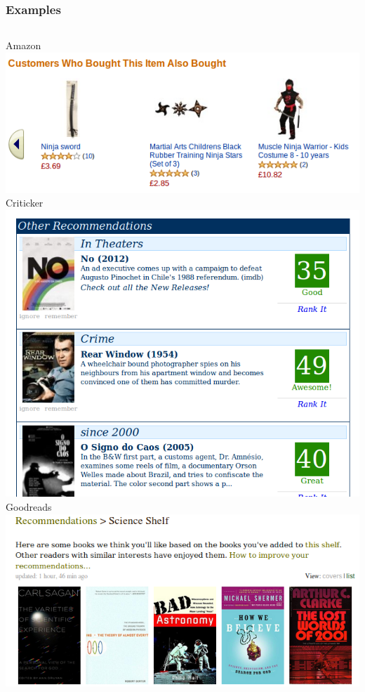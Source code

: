 \documentclass{beamer}
\begin{document}
\begin{frame}
    \frametitle{Examples}
    \begin{columns}
        \centering Amazon\\
        \includegraphics[width=\linewidth]{amazon}\\[\baselineskip]
        \centering Criticker\\
        \includegraphics[width=\linewidth]{criticker}
        \centering Goodreads\\
        \includegraphics[width=\linewidth]{goodreads}\\[\baselineskip]

\end{columns}
\end{frame}
\end{document}
